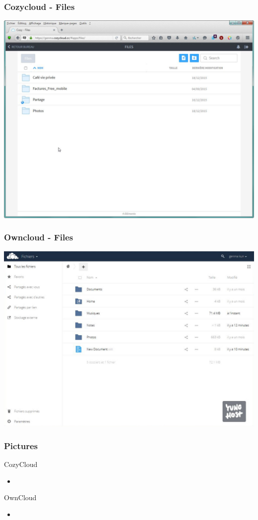 \documentclass{beamer}
\begin{document}
\begin{frame}
\frametitle{Cozycloud - Files}
\includegraphics[scale=0.35] {./CozyCloud/CozyCloud_Files.jpg}
\end{frame}

\begin{frame}
\frametitle{Owncloud - Files}
\includegraphics[scale=0.3] {./Owncloud/Owncloud_Fichiers.jpg}
\end{frame}

\begin{frame}
\frametitle{Pictures}

\begin{block}{CozyCloud}
\begin{itemize}
\item 
\end{itemize}
\end{block}

\begin{block}{OwnCloud}
\begin{itemize}
\item 
\end{itemize}
\end{block}
\end{frame}
\end{document}
